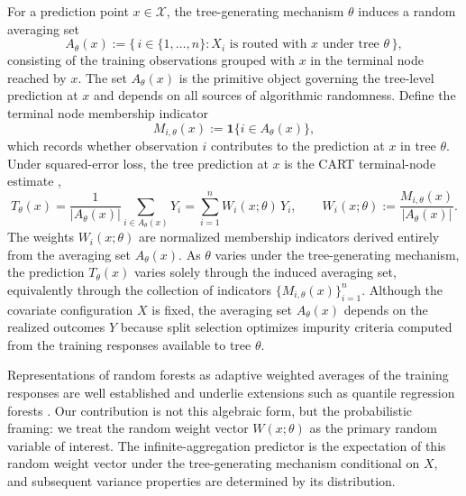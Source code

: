 \documentclass[11pt]{article}
\theoremstyle{plain}
\theoremstyle{definition}
\theoremstyle{remark}
\begin{document}
For a prediction point $x\in\mathcal X$, the tree-generating mechanism $\theta$ induces a random averaging set
\[
A_\theta(x)
:=
\{\, i\in\{1,\ldots,n\} : X_i \text{ is routed with } x \text{ under tree } \theta \,\},
\]
consisting of the training observations grouped with $x$ in the terminal node reached by $x$. The set $A_\theta(x)$ is the primitive object governing the tree-level prediction at $x$ and depends on all sources of algorithmic randomness. Define the terminal node membership indicator
\[
M_{i,\theta}(x)
:=
\mathbf 1\{ i\in A_\theta(x) \},
\]
which records whether observation $i$ contributes to the prediction at $x$ in tree $\theta$. Under squared-error loss, the tree prediction at $x$ is the CART terminal-node estimate \citep{breiman1984},
\[
T_\theta(x)
=
\frac{1}{|A_\theta(x)|}\sum_{i\in A_\theta(x)} Y_i
=
\sum_{i=1}^n W_i(x;\theta)\,Y_i,
\qquad
W_i(x;\theta)
:=
\frac{M_{i,\theta}(x)}{|A_\theta(x)|}.
\]
The weights $W_i(x;\theta)$ are normalized membership indicators derived entirely from the averaging set $A_\theta(x)$. As $\theta$ varies under the tree-generating mechanism, the prediction $T_\theta(x)$ varies solely through the induced averaging set, equivalently through the collection of indicators $\{M_{i,\theta}(x)\}_{i=1}^n$. Although the covariate configuration $X$ is fixed, the averaging set $A_\theta(x)$ depends on the realized outcomes $Y$ because split selection optimizes impurity criteria computed from the training responses available to tree $\theta$.

Representations of random forests as adaptive weighted averages of the training responses are well established \citep{lin2006,biau2010,scornet2015} and underlie extensions such as quantile regression forests \citep{meinshausen2006}. Our contribution is not this algebraic form, but the probabilistic framing: we treat the random weight vector $W(x;\theta)$ as the primary random variable of interest. The infinite-aggregation predictor is the expectation of this random weight vector under the tree-generating mechanism conditional on $X$, and subsequent variance properties are determined by its distribution.
\end{document}
